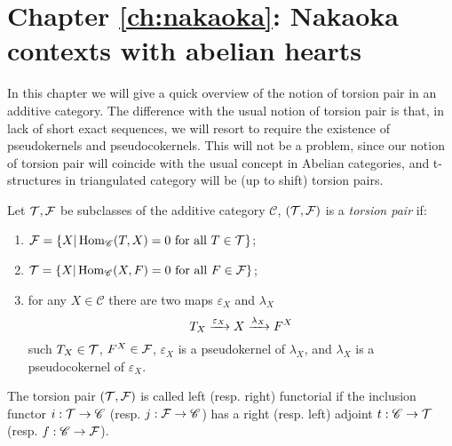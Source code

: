 \section*{Chapter \ref{ch:nakaoka}: Nakaoka contexts with abelian hearts}

In this chapter we will give a quick overview of the notion of torsion pair in an additive category. The difference with the usual notion of torsion pair is that, in lack of short exact sequences, we will resort to require the existence of pseudokernels and pseudocokernels. This will not be a problem, since our notion of torsion pair will coincide with the usual concept in Abelian categories, and t-structures in triangulated category will be (up to shift) torsion pairs.

\begin{nonlisting_def}
  Let $\mathcal{T},\mathcal{F}$ be subclasses of the additive category $\mathscr{C}$, $(\mathcal{T},\mathcal{F})$ is a \emph{torsion pair} if:
  \begin{enumerate}
    \item $\mathcal{F}=\{X|\operatorname{Hom}_\mathscr{C}(T,X)=0\text{ for all }T\in\mathcal{T}\}$;
    \item $\mathcal{T}=\{X|\operatorname{Hom}_\mathscr{C}(X,F)=0\text{ for all }F\in\mathcal{F}\}$;
    \item for any $X\in\mathscr{C}$ there are two maps $\varepsilon_X$ and $\lambda_X$
      \[
        T_X\xrightarrow{\varepsilon_X}X\xrightarrow{\lambda_X}F^X
      \]
      such $T_X\in\mathcal{T}$, $F^X\in\mathcal{F}$, $\varepsilon_X$ is a pseudokernel of $\lambda_X$, and $\lambda_X$ is a pseudocokernel of $\varepsilon_X$.
  \end{enumerate}

  The torsion pair $(\mathcal{T},\mathcal{F})$ is called left (resp. right) functorial if the inclusion functor $i:\mathcal{T}\to \mathscr{C}$ (resp. $j:\mathcal{F}\to\mathscr{C}$) has a right (resp. left) adjoint $t:\mathscr{C}\to \mathcal{T}$ (resp. $f:\mathscr{C}\to \mathcal{F}$).
\end{nonlisting_def}

